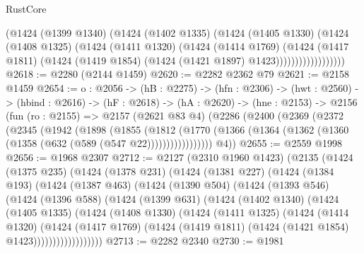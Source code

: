 \begin{lexlean}{RustCore}
\begin{coremodule}
                      (@1424
                        (@1399 @1340)
                        (@1424
                          (@1402 @1335)
                          (@1424
                            (@1405 @1330)
                            (@1424
                              (@1408 @1325)
                              (@1424
                                (@1411 @1320)
                                (@1424
                                  (@1414 @1769)
                                  (@1424
                                    (@1417 @1811)
                                    (@1424
                                      (@1419 @1854)
                                      (@1424 (@1421 @1897) @1423))))))))))))))))))
@2618 := @2280 (@2144 @1459)
@2620 := @2282 @2362 @79
@2621 := @2158 @1459
@2654 := {o : @2056} ->
  (hB : @2275) ->
  (hfn : @2306) ->
  (hwt : @2560) ->
  (hbind : @2616) ->
  (hF : @2618) ->
  (hA : @2620) ->
  (hne : @2153) ->
  @2156
    (fun (ro : @2155) =>
    @2157
      (@2621 @83 @4)
      (@2286
        (@2400
          (@2369
            (@2372
              (@2345
                (@1942
                  (@1898
                    (@1855
                      (@1812
                        (@1770
                          (@1366 (@1364 (@1362 (@1360 (@1358 (@632 (@589 (@547 @22)))))))))))))))))
        @4))
@2655 := @2559 @1998
@2656 := @1968 @2307
@2712 := @2127
    (@2310 @1960 @1423)
    (@2135
      (@1424
        (@1375 @235)
        (@1424
          (@1378 @231)
          (@1424
            (@1381 @227)
            (@1424
              (@1384 @193)
              (@1424
                (@1387 @463)
                (@1424
                  (@1390 @504)
                  (@1424
                    (@1393 @546)
                    (@1424
                      (@1396 @588)
                      (@1424
                        (@1399 @631)
                        (@1424
                          (@1402 @1340)
                          (@1424
                            (@1405 @1335)
                            (@1424
                              (@1408 @1330)
                              (@1424
                                (@1411 @1325)
                                (@1424
                                  (@1414 @1320)
                                  (@1424
                                    (@1417 @1769)
                                    (@1424
                                      (@1419 @1811)
                                      (@1424 (@1421 @1854) @1423))))))))))))))))))
@2713 := @2282 @2340
@2730 := @1981

\end{coremodule}
\end{lexlean}
